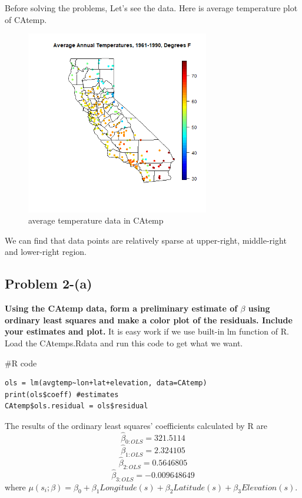 \documentclass{article}
\newenvironment{Rcode}%
{%
    \begin{mdframed}
    \#R code
    \begin{small}
}
{%
    \end{small}
    \end{mdframed}
}
\begin{document}
Before solving the problems, Let's see the data. Here is average temperature plot of CAtemp.
\begin{figure}[!h]
    \centering
    \includegraphics[height=8cm]{prob2_CAtemp_avgtemp.png}
    \caption{average temperature data in CAtemp}
\end{figure}
We can find that data points are relatively sparse at upper-right, middle-right and lower-right region.


\clearpage
\subsection{Problem 2-(a)}
\textbf{
Using the CAtemp data, form a preliminary estimate of $\beta$ using ordinary least squares 
and make a color plot of the residuals.
Include your estimates and plot.
}
It is easy work if we use built-in lm function of R.
Load the CAtemps.Rdata and run this code to get what we want.
\begin{Rcode}
    \begin{verbatim}
ols = lm(avgtemp~lon+lat+elevation, data=CAtemp)
print(ols$coeff) #estimates
CAtemp$ols.residual = ols$residual
    \end{verbatim}
\end{Rcode}
The results of the ordinary least squares' coefficients calculated by R are
\[\hat{\beta}_{0:OLS}=321.5114\]
\[\hat{\beta}_{1:OLS}=2.324105\]
\[\hat{\beta}_{2:OLS}=0.5646805\]
\[\hat{\beta}_{3:OLS}=-0.009648649\]
where \(\mu(s_i;\beta)=\beta_0+\beta_1 Longitude(s) + \beta_2 Latitude(s)+\beta_3 Elevation(s)\).
\end{document}
